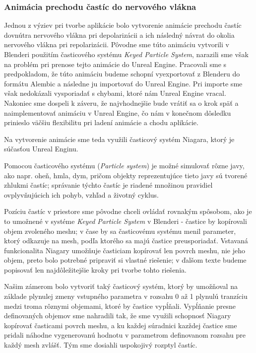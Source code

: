 \subsubsection{Animácia prechodu častíc do nervového vlákna}
Jednou z výziev pri tvorbe aplikácie bolo vytvorenie animácie prechodu častíc dovnútra nervového vlákna pri depolarizácii a ich následný návrat do okolia nervového vlákna pri repolarizácii. 
Pôvodne sme túto animáciu vytvorili v Blenderi použitím časticového systému \emph{Keyed Particle System}, narazili sme však na problém pri prenose tejto animácie do Unreal Engine. Pracovali sme s predpokladom, 
že túto animáciu budeme schopní vyexportovať z Blenderu do formátu Alembic a následne ju importovať do Unreal Engine. Pri importe sme však nedokázali vysporiadať s chybami, ktoré nám Unreal Engine vracal.
Nakoniec sme dospeli k záveru, že najvhodnejšie bude vrátiť sa o krok späť a naimplementovať animáciu v Unreal Engine, čo nám v konečnom dôsledku prinieslo väčšiu flexibilitu pri ladení animácie a chodu aplikácie.

Na vytvorenie animácie sme teda využili časticový systém Niagara, ktorý je súčasťou Unreal Enginu. 

Pomocou časticového systému (\emph{Particle system}) je možné simulovať rôzne javy, ako napr. oheň, hmla, dym, pričom objekty reprezentujúce tieto javy sú tvorené zhlukmi častíc; správanie týchto častíc
je riadené množinou pravidiel ovplyvňujúcich ich pohyb, vzhľad a životný cyklus.

Pozíciu častíc v priestore sme pôvodne chceli ovládať rovnakým spôsobom, ako je to umožnené v systéme \emph{Keyed Particle System} v Blenderi - častice by kopírovali objem zvoleného meshu; v čase by 
sa časticovému systému menil parameter, ktorý odkazuje na mesh, podľa ktorého sa majú častice preusporiadať. Vstavaná funkcionalita Niagary umožňuje časticiam kopírovať len povrch meshu, nie jeho objem, 
preto bolo potrebné pripraviť si vlastné riešenie; v ďalšom texte budeme popisovať len najdôležitejšie kroky pri tvorbe tohto riešenia. 

Našim zámerom bolo vytvoriť taký časticový systém, ktorý by umožňoval na základe plynulej zmeny vstupného parametra v rozsahu 0 až 1 plynulú tranzíciu medzi troma rôznymi objemami, ktoré by častice vypĺňali.
Vypĺňanie presne definovaných objemov sme nahradili tak, že sme využili schopnosť Niagary kopírovať časticami povrch meshu, a ku každej súradnici kazždej častice sme pridali náhodne vygenerovanú hodnotu v 
parametrom definovanom rozsahu pre každý mesh zvlášť. Tým sme dosiahli uspokojivý rozptyl častíc.

